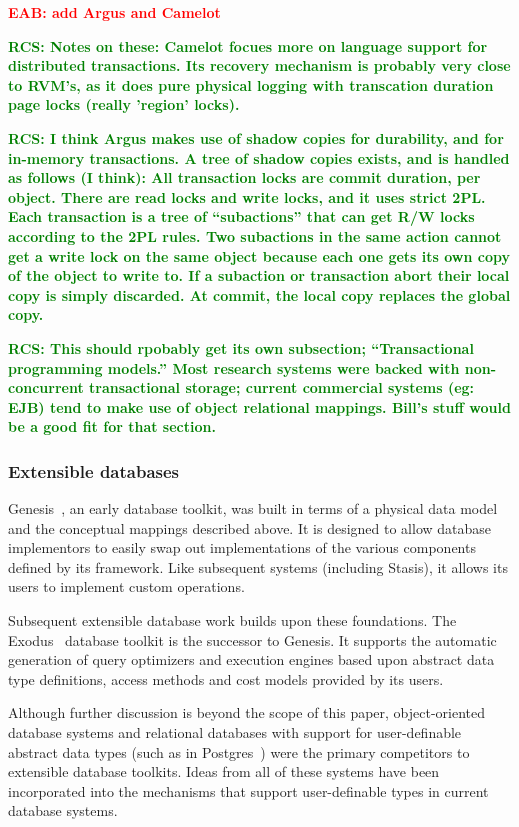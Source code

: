 \documentclass[letterpaper,twocolumn,10pt]{article}
\newcommand{\yad}{Stasis\xspace}
\newcommand{\eab}[1]{\textcolor{red}{\bf EAB: #1}}
\newcommand{\rcs}[1]{\textcolor{green}{\bf RCS: #1}}
\begin{document}
\eab{add Argus and Camelot}

\rcs{ Notes on these: Camelot focues more on language support for
distributed transactions.  Its recovery mechanism is probably very
close to RVM's, as it does pure physical logging with transcation
duration page locks (really 'region' locks). }

\rcs{ I think Argus makes use of shadow copies for durability, and for
in-memory transactions.  A tree of shadow copies exists, and is handled as
follows (I think): All transaction locks are commit duration, per
object.  There are read locks and write locks, and it uses strict 2PL.
Each transaction is a tree of ``subactions'' that can get R/W locks
according to the 2PL rules.  Two subactions in the same action cannot
get a write lock on the same object because each one gets its own copy
of the object to write to.  If a subaction or transaction abort their
local copy is simply discarded.  At commit, the local copy replaces
the global copy.}

\rcs{This should rpobably get its own subsection; ``Transactional
programming models.''  Most research systems were backed with
non-concurrent transactional storage; current commercial systems (eg:
EJB) tend to make use of object relational mappings.  Bill's stuff would be a good fit for that section.}

\subsubsection{Extensible databases}

Genesis~\cite{genesis}, an early database toolkit, was built in terms
of a physical data model and the conceptual mappings described above.
It is designed to allow database implementors to easily swap out
implementations of the various components defined by its framework.
Like subsequent systems (including \yad), it allows its users to
implement custom operations.

Subsequent extensible database work builds upon these foundations.
The Exodus~\cite{exodus} database toolkit is the successor to
Genesis. It supports the automatic generation of query optimizers and
execution engines based upon abstract data type definitions, access
methods and cost models provided by its users.

Although further discussion is beyond the scope of this paper,
object-oriented database systems and relational databases with
support for user-definable abstract data types (such as in
Postgres~\cite{postgres}) were the primary competitors to extensible
database toolkits.  Ideas from all of these systems have been
incorporated into the mechanisms that support user-definable types in
current database systems.
\end{document}

